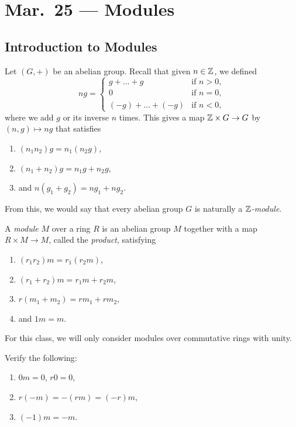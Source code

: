 \chapter{Mar.~25 --- Modules}

\section{Introduction to Modules}
\begin{remark}
  Let $(G, +)$ be an abelian group. Recall that given
  $n \in \mathbb{Z}$, we defined
  \[
    ng =
    \begin{cases}
      g + \dots + g & \text{if } n > 0, \\
      0 & \text{if } n = 0, \\
      (-g) + \dots + (-g) & \text{if } n < 0,
    \end{cases}
  \]
  where we add $g$ or its inverse $n$ times. This
  gives a map $\mathbb{Z} \times G \to G$ by
  $(n, g) \mapsto ng$ that satisfies
  \begin{enumerate}
    \item $(n_1 n_2)g = n_1(n_2 g)$,
    \item $(n_1 + n_2) g = n_1 g + n_2 g$,
    \item and $n(g_1 + g_2) = ng_1 + ng_2$.
  \end{enumerate}
  From this, we would say that every abelian group $G$ is
  naturally a \emph{$\mathbb{Z}$-module}.
\end{remark}

\begin{definition}
  A \emph{module} $M$ over a ring $R$ is an abelian
  group $M$ together with a map $R \times M \to M$,
  called the \emph{product}, satisfying
  \begin{enumerate}
    \item $(r_1 r_2) m = r_1 (r_2 m)$,
    \item $(r_1 + r_2) m = r_1 m + r_2 m$,
    \item $r(m_1 + m_2) = rm_1 + rm_2$,
    \item and $1 m = m$.
  \end{enumerate}
\end{definition}

\begin{remark}
  For this class, we will only
  consider modules over commutative rings with unity.
\end{remark}

\begin{exercise}
  Verify the following:
  \begin{enumerate}
    \item $0m = 0$, $r 0 = 0$,
    \item $r(-m) = -(rm) = (-r)m$,
    \item $(-1)m = -m$.
  \end{enumerate}
\end{exercise}

